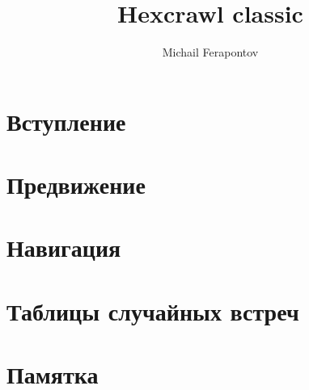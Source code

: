 \documentclass[a4paper, 12pt]{article}
\title{Hexcrawl classic}
\author{Michail Ferapontov}
\date{}
\begin{document}
  \maketitle

  \tableofcontents
  \newpage
  \section{Вступление}
  \newpage

  \section{Предвижение}
  
  \newpage

  \section{Навигация}
  
  \newpage

  \section{Таблицы случайных встреч}
  
  \newpage

  \section{Памятка}
  
  \newpage
\end{document}
